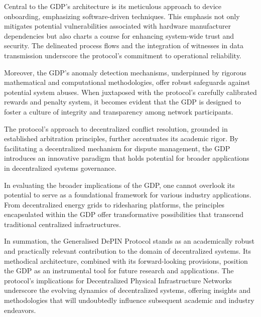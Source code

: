 \documentclass{article}
\begin{document}
Central to the GDP's architecture is its meticulous approach to device onboarding, emphasizing software-driven techniques. This emphasis not only mitigates potential vulnerabilities associated with hardware manufacturer dependencies but also charts a course for enhancing system-wide trust and security. The delineated process flows and the integration of witnesses in data transmission underscore the protocol's commitment to operational reliability.

Moreover, the GDP's anomaly detection mechanisms, underpinned by rigorous mathematical and computational methodologies, offer robust safeguards against potential system abuses. When juxtaposed with the protocol's carefully calibrated rewards and penalty system, it becomes evident that the GDP is designed to foster a culture of integrity and transparency among network participants.

The protocol's approach to decentralized conflict resolution, grounded in established arbitration principles, further accentuates its academic rigor. By facilitating a decentralized mechanism for dispute management, the GDP introduces an innovative paradigm that holds potential for broader applications in decentralized systems governance.

In evaluating the broader implications of the GDP, one cannot overlook its potential to serve as a foundational framework for various industry applications. From decentralized energy grids to ridesharing platforms, the principles encapsulated within the GDP offer transformative possibilities that transcend traditional centralized infrastructures.

In summation, the Generalised DePIN Protocol stands as an academically robust and practically relevant contribution to the domain of decentralized systems. Its methodical architecture, combined with its forward-looking provisions, position the GDP as an instrumental tool for future research and applications. The protocol's implications for Decentralized Physical Infrastructure Networks underscore the evolving dynamics of decentralized systems, offering insights and methodologies that will undoubtedly influence subsequent academic and industry endeavors.



\end{document}
